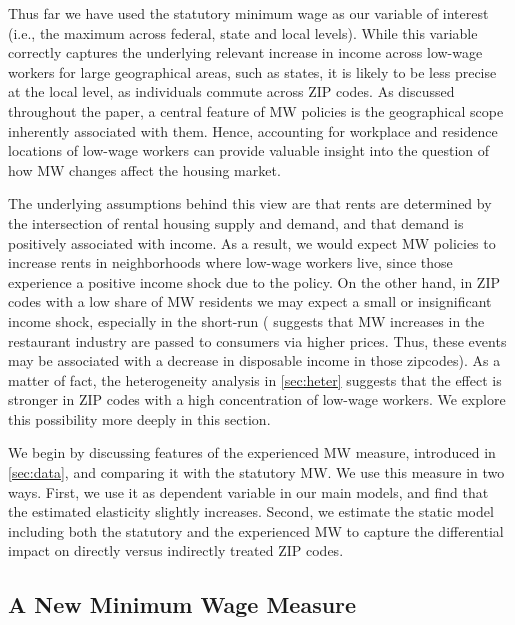 
Thus far we have used the statutory minimum wage as our variable of interest (i.e., 
the maximum across federal, state and local levels). While this variable correctly 
captures the underlying relevant increase in income across low-wage workers for large
geographical areas, such as states, it is likely to be less precise at the local level, 
as individuals commute across ZIP codes. As discussed throughout the paper, a central 
feature of MW policies is the geographical scope inherently associated with them. 
Hence, accounting for workplace and residence locations of low-wage workers can 
provide valuable insight into the question of how MW changes affect the housing 
market. 

The underlying assumptions behind this view are that rents are determined by the 
intersection of rental housing supply and demand, and that demand is positively 
associated with income. As a result, we would expect MW policies to increase 
rents in neighborhoods where low-wage workers live, since those experience a positive
income shock due to the policy. On the other hand, in ZIP codes with a low share 
of MW residents we may expect a small or insignificant income shock, especially 
in the short-run (\cite{allegretto2018local} suggests that MW increases in the 
restaurant industry are passed to consumers via higher prices. Thus, these events may 
be associated with a decrease in disposable income in those zipcodes). 
As a matter of fact, the heterogeneity analysis in \autoref{sec:heter} suggests that 
the effect is stronger in ZIP codes with a high concentration of low-wage workers. 
We explore this possibility more deeply in this section.

We begin by discussing features of the experienced MW measure, introduced in 
\autoref{sec:data}, and comparing it with the statutory MW. We use this measure in two 
ways. First, we use it as dependent variable in our main models, and find that the 
estimated elasticity slightly increases. Second, we estimate the static model including 
both the statutory and the experienced MW to capture the differential impact on 
directly versus indirectly treated ZIP codes.

\subsection{A New Minimum Wage Measure}

